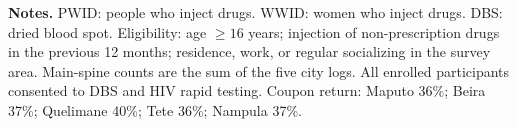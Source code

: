 \documentclass[11pt]{article}
\begin{document}
\begin{center}
\end{center}

\vspace{2mm}
{\footnotesize
\textbf{Notes.}
PWID: people who inject drugs. WWID: women who inject drugs. DBS: dried blood spot.
Eligibility: age $\geq 16$ years; injection of non-prescription drugs in the previous
12 months; residence, work, or regular socializing in the survey area.
Main-spine counts are the sum of the five city logs. All enrolled participants
consented to DBS and HIV rapid testing.
Coupon return: Maputo 36\%; Beira 37\%; Quelimane 40\%; Tete 36\%; Nampula 37\%.
}
\end{document}
